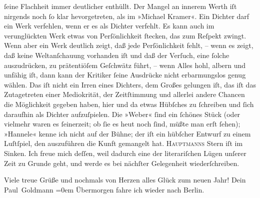                ſeine Flachheit immer deutlicher enthüllt. Der Mangel an innerem Werth iſt nirgends
               noch ſo klar hevorgetreten, als im »Michael
                  Kramer«. Ein Dichter darf ein Werk verfehlen, wenn er es als Dichter
               verfehlt. Es kann auch im verunglückten Werk  etwas
               von Perſönlichkeit ſtecken, das zum Reſpekt zwingt. {\pb}Wenn aber ein Werk deutlich zeigt, daß jede Perſönlichkeit fehlt, – wenn es zeigt,
               daß keine Weltanſchauung vorhanden iſt und daß der Verſuch, eine ſolche auszudrücken,
               zu  prätentiöſem Geſchwätz führt, – wenn Alles
               hohl, albern und unfähig iſt, dann kann der Kritiker ſeine Ausdrücke nicht
               erbarmungslos genug  wählen. Das iſt nicht ein
               Irren eines Dichters, dem Großes gelungen iſt, das iſt das Zutagetreten einer
               Mediokrität, der Zeitſtimmung und allerlei andere Chancen die Möglichkeit gegeben
               haben, hier und da etwas Hübſches zu ſchreiben und ſich daraufhin als Dichter
               aufzuſpielen. Die »Weber« {\pb}ſind ein ſchönes Stück (oder vielmehr  waren
               es ſeinerzeit;  ob ſie es heut noch ſind, müßte
               man erſt  ſehen); »Hannele«  kenne ich nicht auf der Bühne; der \label{K_L02947-2v}\label{K_L02947-2} iſt ein hübſcher Entwurf zu einem Luſtſpiel, den auszuführen die Kunft
               gemangelt hat. \textsc{Hauptmanns} Stern iſt im Sinken. Ich
               freue mich deſſen, weil dadurch eine der literariſchen Lügen unſerer Zeit zu Grunde
               geht, und werde es bei nächſter Gelegenheit wiederſchreiben.\pend
           
\pstart
           Viele treue Grüße und nochmals von Herzen alles Glück zum neuen Jahr! Dein {\\[\baselineskip]}\spacefill\mbox{Paul Goldmann}\pend
           \leftskip=0em{}
\pstart
           \noindent{}Übermorgen fahre ich wieder nach Berlin.\pend
           \endnumbering{}  
      